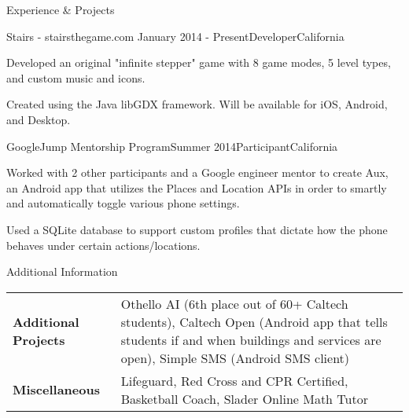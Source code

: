 \documentclass{resume} %
\begin{document}
\begin{rSection}{Experience \& Projects}

\begin{rSubsection}{Stairs - stairsthegame.com }{January 2014 - Present}{Developer}{California}
\item Developed an original "infinite stepper" game with 8 game modes,
    5 level types, and custom music and icons.
\item Created using the Java libGDX framework. Will be available for iOS, Android,
    and Desktop.
\end{rSubsection}


\begin{rSubsection}{GoogleJump Mentorship Program}{Summer 2014}{Participant}{California}
\item Worked with 2 other participants and a Google engineer mentor to create Aux,
    an Android app that utilizes the Places and Location APIs in order to smartly
    and automatically toggle various phone settings.
\item Used a SQLite database to support custom profiles that dictate how the phone behaves
    under certain actions/locations.
\end{rSubsection}

\end{rSection}




\begin{rSection}{Additional Information}

\noindent\begin{tabularx}{.98\textwidth}{@{}lX}
    \bfseries{Additional Projects}   &  Othello AI (6th place out of 60+ Caltech
    students), Caltech Open (Android app that tells students if and when
    buildings and services are open), Simple SMS (Android SMS client) \\
    \bfseries{Miscellaneous}   &  Lifeguard, Red Cross and CPR Certified, Basketball
    Coach, Slader Online Math Tutor \\
\end{tabularx}

\end{rSection}
\end{document}
